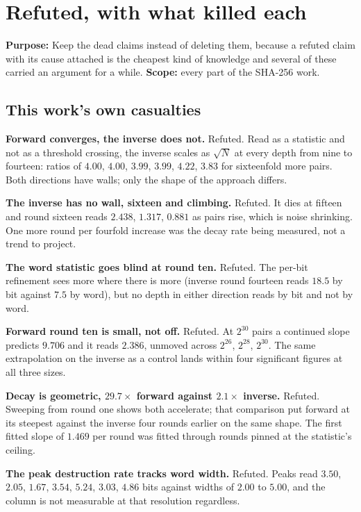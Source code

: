 \chapter{Refuted, with what killed each}

\textbf{Purpose:} Keep the dead claims instead of deleting them, because a refuted claim with its cause attached is the cheapest kind of knowledge and several of these carried an argument for a while. \textbf{Scope:} every part of the SHA-256 work.

\section{This work's own casualties}

\textbf{Forward converges, the inverse does not.} Refuted. Read as a statistic and not as a threshold crossing, the inverse scales as \(\sqrt{N}\) at every depth from nine to fourteen: ratios of \(4.00\), \(4.00\), \(3.99\), \(3.99\), \(4.22\), \(3.83\) for sixteenfold more pairs. Both directions have walls; only the shape of the approach differs.

\textbf{The inverse has no wall, sixteen and climbing.} Refuted. It dies at fifteen and round sixteen reads \(2.438\), \(1.317\), \(0.881\) as pairs rise, which is noise shrinking. One more round per fourfold increase was the decay rate being measured, not a trend to project.

\textbf{The word statistic goes blind at round ten.} Refuted. The per-bit refinement sees more where there is more (inverse round fourteen reads \(18.5\) by bit against \(7.5\) by word), but no depth in either direction reads by bit and not by word.

\textbf{Forward round ten is small, not off.} Refuted. At \(2^{30}\) pairs a continued slope predicts \(9.706\) and it reads \(2.386\), unmoved across \(2^{26}\), \(2^{28}\), \(2^{30}\). The same extrapolation on the inverse as a control lands within four significant figures at all three sizes.

\textbf{Decay is geometric, \(29.7\times\) forward against \(2.1\times\) inverse.} Refuted. Sweeping from round one shows both accelerate; that comparison put forward at its steepest against the inverse four rounds earlier on the same shape. The first fitted slope of \(1.469\) per round was fitted through rounds pinned at the statistic's ceiling.

\textbf{The peak destruction rate tracks word width.} Refuted. Peaks read \(3.50\), \(2.05\), \(1.67\), \(3.54\), \(5.24\), \(3.03\), \(4.86\) bits against widths of \(2.00\) to \(5.00\), and the column is not measurable at that resolution regardless.

